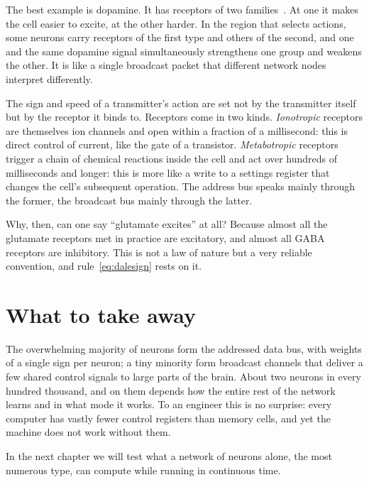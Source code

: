 The best example is dopamine. It has receptors of two families~\cite{Beaulieu2011}. At one it makes the cell easier to excite, at the other harder. In the region that selects actions, some neurons carry receptors of the first type and others of the second, and one and the same dopamine signal simultaneously strengthens one group and weakens the other. It is like a single broadcast packet that different network nodes interpret differently.

\begin{keyblock}
\begin{proposition}
\label{prop:receptor}
The sign and speed of a transmitter's action are set not by the transmitter itself but by the receptor it binds to. Receptors come in two kinds. \emph{Ionotropic} receptors are themselves ion channels and open within a fraction of a millisecond: this is direct control of current, like the gate of a transistor. \emph{Metabotropic} receptors trigger a chain of chemical reactions inside the cell and act over hundreds of milliseconds and longer: this is more like a write to a settings register that changes the cell's subsequent operation. The address bus speaks mainly through the former, the broadcast bus mainly through the latter.
\end{proposition}
\end{keyblock}

Why, then, can one say ``glutamate excites'' at all? Because almost all the glutamate receptors met in practice are excitatory, and almost all GABA receptors are inhibitory. This is not a law of nature but a very reliable convention, and rule~\eqref{eq:dalesign} rests on it.

\section{What to take away}

The overwhelming majority of neurons form the addressed data bus, with weights of a single sign per neuron; a tiny minority form broadcast channels that deliver a few shared control signals to large parts of the brain. About two neurons in every hundred thousand, and on them depends how the entire rest of the network learns and in what mode it works. To an engineer this is no surprise: every computer has vastly fewer control registers than memory cells, and yet the machine does not work without them.

In the next chapter we will test what a network of  neurons alone, the most numerous type, can compute while running in continuous time.

